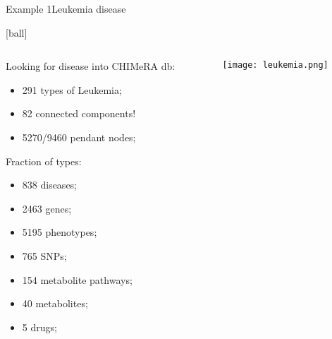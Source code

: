 \documentclass{standalone}
\begin{document}
\begin{frame}{Example 1}{Leukemia disease}

  [ball]

  \begin{columns}
    \begin{column}{0.4\textwidth}
      Looking for  disease into CHIMeRA db:

      \begin{itemize}
        \setlength\itemsep{0.5em}
        \item 291 types of Leukemia;
        \item 82 connected components!
        \item 5270/9460 pendant nodes;
      \end{itemize}

      Fraction of types:

      \begin{itemize}
        \item 838 diseases;
        \item 2463 genes;
        \item 5195 phenotypes;
        \item 765 SNPs;
        \item 154 metabolite pathways;
        \item 40 metabolites;
        \item 5 drugs;

      \end{itemize}
    \end{column}

    \begin{column}{0.6\textwidth}
      \centering\texttt{[image: leukemia.png]}
    \end{column}
  \end{columns}

\end{frame}
\end{document}
